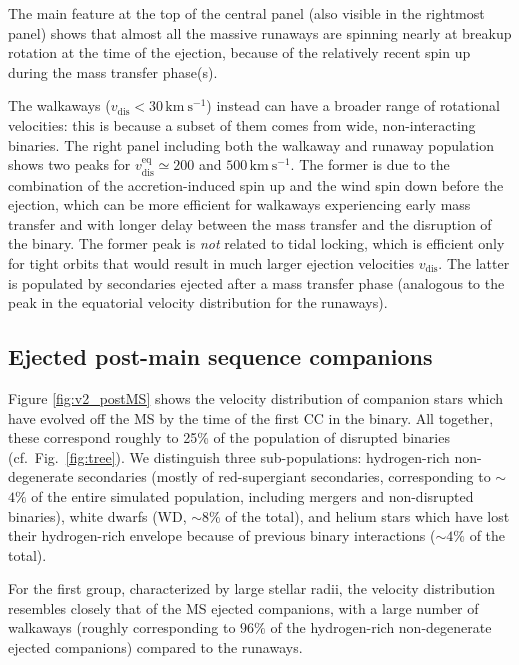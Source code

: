 \documentclass{aa}
\DeclareRobustCommand{\Figref}[1]{Fig.~\ref{#1}}
\begin{document}
The main feature at the top of the central panel (also visible in the rightmost panel) shows that almost all the massive runaways are spinning
nearly at breakup rotation at the time of the ejection, because of the
relatively recent spin up during the mass transfer phase(s).

The walkaways ($v_\mathrm{dis}<30\,\mathrm{km\ s^{-1}}$) instead can
have a broader range of rotational velocities: this is because a
subset of them comes from wide, non-interacting binaries. The right
panel including both the walkaway and runaway population shows two
peaks for $v_\mathrm{dis}^\mathrm{eq}\simeq200$ and $500\,\mathrm{km\
  s^{-1}}$. The former is due to the combination of the accretion-induced spin up and the wind spin down
before the ejection, which can be more efficient for walkaways
experiencing early mass transfer and with longer delay between the
mass transfer and the disruption of the binary. The former peak is \emph{not} related to tidal locking, which
is efficient only for tight orbits that would result in much larger ejection
velocities $v_\mathrm{dis}$. The latter is populated by secondaries ejected after a
mass transfer phase (analogous to the peak in the equatorial velocity
distribution for the runaways).

\subsection{Ejected post-main sequence companions}
\label{sec:non-MS-companions}

Figure \ref{fig:v2_postMS} shows the velocity distribution of companion stars which have evolved off
the MS by the time of the first CC in the binary. All
together, these correspond roughly to 25\% of the population of
disrupted binaries (cf.~\Figref{fig:tree}). We distinguish three sub-populations:
hydrogen-rich non-degenerate secondaries (mostly of red-supergiant
secondaries, corresponding to $\sim$$4\%$
of the entire simulated population, including mergers and
non-disrupted binaries), white dwarfs (WD, $\sim$8\% of
the total), and helium stars which have lost their hydrogen-rich envelope because of previous
binary interactions ($\sim4\%$ of the total).

For the first group, characterized by large stellar radii, the velocity distribution resembles
closely that of the MS ejected companions, with a large number
of walkaways (roughly corresponding to $96\%$ of the hydrogen-rich
non-degenerate ejected companions) compared to the runaways.
\end{document}
